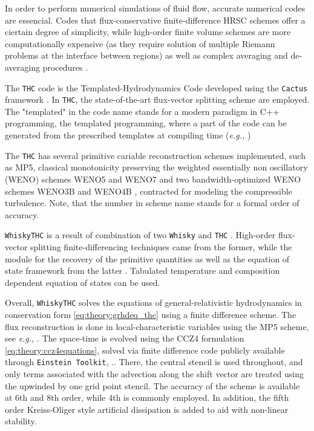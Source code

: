 In order to perform numerical simulations of fluid flow, accurate numerical codes are essencial. Codes that flux-conservative finite-difference HRSC schemes offer a ciertain degree of simplicity, while high-order finite volume schemes are more computationally expensive (as they require solution of multiple Riemann problems at the interface between regions) \cite{Reisswig:2009us,Shu:2001rep} as well as complex averaging and de-averaging procedures \cite{Tchekhovskoy:2007zn}.

The \texttt{THC} code is the Templated-Hydrodynamics Code developed using the \texttt{Cactus} framework \cite{Goodale:2003}. In \texttt{THC}, the state-of-the-art flux-vector splitting scheme are employed. The "templated" in the code name stands for a modern paradigm in C++ programming, the templated programming, where a part of the code can be generated from the prescribed templates at compiling time (\textit{e.g.,} \cite{Yang:2001})

The \texttt{THC} has several primitive cariable reconstruction schemes implemented, such as MP5, classical monotonicity preserving \cite{Suresh:1997,Mignone:2010} the weighted essentially non oscillatory (WENO) schemes WENO5 and WENO7 \cite{Liu:1994,Jiang:1996,Shu:1997} and two bandwidth-optimized WENO schemes WENO3B and WENO4B \cite{Martin:2006,Taylor:2007}, contracted for modeling the compressible turbulence. Note, that the number in scheme name stands for a formal order of accuracy.

\texttt{WhiskyTHC} is a result of combination of two \texttt{Whisky} \cite{Baiotti:2004wn} and \texttt{THC} \cite{Radice:2012cu}. High-order flux-vector splitting finite-differencing techniques came from the former, while the module for the recovery of the primitive quantities as well as the equation of state framework from the latter \cite{Galeazzi:2013mia}. Tabulated temperature and composition dependent equation of states can be used.

Overall, \texttt{WhiskyTHC} solves the equations of general-relativistic hydrodynamics in conservation form \ref{eq:theory:grhdeq_thc} using a finite difference scheme. 
The flux reconstruction is done in local-characteristic variables using the MP5 scheme, see \textit{e.g.,} \cite{Rezzolla:2013} .
The space-time is evolved using the CCZ4 formulation \ref{eq:theory:ccz4equations}, solved via finite difference code publicly available through \texttt{Einstein Toolkit}, \cite{McLachlan,Loffler:2011ay}..
There, the central stencil is used throughout, and only terms associated with the advection along the shift vector are treated using the upwinded by one grid point stencil. The accuracy of the scheme is available at 6th and 8th order, while 4th is commonly employed. In addition, the fifth order Kreiss-Oliger style artificial dissipation \cite{Kreiss:1973} is added to aid with non-linear stability.

